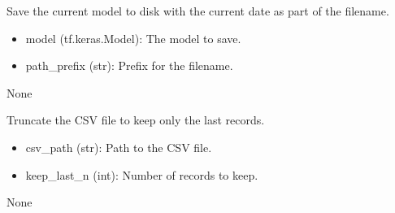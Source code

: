 \documentclass[letterpaper,10pt,english]{sphinxmanual}
\begin{document}
\begin{fulllineitems}
\label{\detokenize{network_watcher:network_watcher.save_model_with_date}}
\pysigstartsignatures
{}
\pysigstopsignatures
\sphinxAtStartPar
Save the current model to disk with the current date as part of the filename.
\begin{description}
\begin{itemize}
\item {} 
\sphinxAtStartPar
model (tf.keras.Model): The model to save.

\item {} 
\sphinxAtStartPar
path\_prefix (str): Prefix for the filename.

\end{itemize}

\sphinxAtStartPar
None

\end{description}

\end{fulllineitems}


\begin{fulllineitems}
\label{\detokenize{network_watcher:network_watcher.truncate_running_data}}
\pysigstartsignatures
{}
\pysigstopsignatures
\sphinxAtStartPar
Truncate the CSV file to keep only the last  records.
\begin{description}
\begin{itemize}
\item {} 
\sphinxAtStartPar
csv\_path (str): Path to the CSV file.

\item {} 
\sphinxAtStartPar
keep\_last\_n (int): Number of records to keep.

\end{itemize}

\sphinxAtStartPar
None

\end{description}

\end{fulllineitems}
\end{document}

